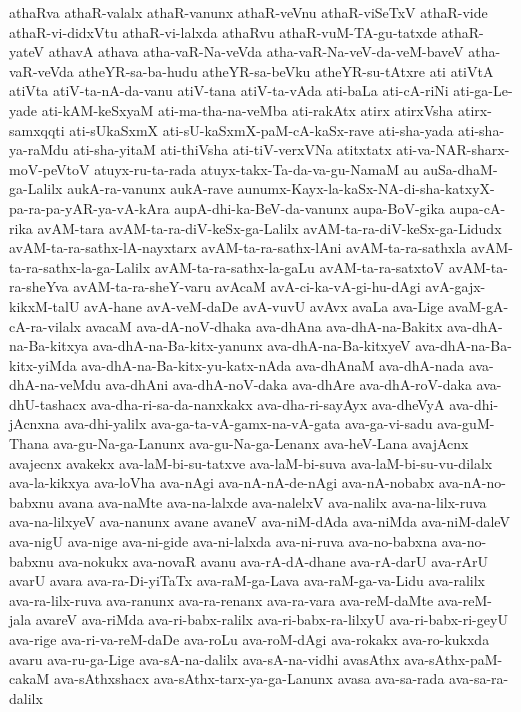 {athaRva
athaR-valalx
athaR-vanunx
athaR-veVnu
athaR-viSeTxV
athaR-vide
athaR-vi-didxVtu
athaR-vi-lalxda
athaRvu
athaR-vuM-TA-gu-tatxde
athaR-yateV
athavA
athava
atha-vaR-Na-veVda
atha-vaR-Na-veV-da-veM-baveV
atha-vaR-veVda
atheYR-sa-ba-hudu
atheYR-sa-beVku
atheYR-su-tAtxre
ati
atiVtA
atiVta
atiV-ta-nA-da-vanu
atiV-tana
atiV-ta-vAda
ati-baLa
ati-cA-riNi
ati-ga-Le-yade
ati-kAM-keSxyaM
ati-ma-tha-na-veMba
ati-rakAtx
atirx
atirxVsha
atirx-samxqqti
ati-sUkaSxmX
ati-sU-kaSxmX-paM-cA-kaSx-rave
ati-sha-yada
ati-sha-ya-raMdu
ati-sha-yitaM
ati-thiVsha
ati-tiV-verxVNa
atitxtatx
ati-va-NAR-sharx-moV-peVtoV
atuyx-ru-ta-rada
atuyx-takx-Ta-da-va-gu-NamaM
au
auSa-dhaM-ga-Lalilx
aukA-ra-vanunx
aukA-rave
aunumx-Kayx-la-kaSx-NA-di-sha-katxyX-pa-ra-pa-yAR-ya-vA-kAra
aupA-dhi-ka-BeV-da-vanunx
aupa-BoV-gika
aupa-cA-rika
avAM-tara
avAM-ta-ra-diV-keSx-ga-Lalilx
avAM-ta-ra-diV-keSx-ga-Lidudx
avAM-ta-ra-sathx-lA-nayxtarx
avAM-ta-ra-sathx-lAni
avAM-ta-ra-sathxla
avAM-ta-ra-sathx-la-ga-Lalilx
avAM-ta-ra-sathx-la-gaLu
avAM-ta-ra-satxtoV
avAM-ta-ra-sheYva
avAM-ta-ra-sheY-varu
avAcaM
avA-ci-ka-vA-gi-hu-dAgi
avA-gajx-kikxM-talU
avA-hane
avA-veM-daDe
avA-vuvU
avAvx
avaLa
ava-Lige
avaM-gA-cA-ra-vilalx
avacaM
ava-dA-noV-dhaka
ava-dhAna
ava-dhA-na-Bakitx
ava-dhA-na-Ba-kitxya
ava-dhA-na-Ba-kitx-yanunx
ava-dhA-na-Ba-kitxyeV
ava-dhA-na-Ba-kitx-yiMda
ava-dhA-na-Ba-kitx-yu-katx-nAda
ava-dhAnaM
ava-dhA-nada
ava-dhA-na-veMdu
ava-dhAni
ava-dhA-noV-daka
ava-dhAre
ava-dhA-roV-daka
ava-dhU-tashacx
ava-dha-ri-sa-da-nanxkakx
ava-dha-ri-sayAyx
ava-dheVyA
ava-dhi-jAcnxna
ava-dhi-yalilx
ava-ga-ta-vA-gamx-na-vA-gata
ava-ga-vi-sadu
ava-guM-Thana
ava-gu-Na-ga-Lanunx
ava-gu-Na-ga-Lenanx
ava-heV-Lana
avajAcnx
avajecnx
avakekx
ava-laM-bi-su-tatxve
ava-laM-bi-suva
ava-laM-bi-su-vu-dilalx
ava-la-kikxya
ava-loVha
ava-nAgi
ava-nA-nA-de-nAgi
ava-nA-nobabx
ava-nA-no-babxnu
avana
ava-naMte
ava-na-lalxde
ava-nalelxV
ava-nalilx
ava-na-lilx-ruva
ava-na-lilxyeV
ava-nanunx
avane
avaneV
ava-niM-dAda
ava-niMda
ava-niM-daleV
ava-nigU
ava-nige
ava-ni-gide
ava-ni-lalxda
ava-ni-ruva
ava-no-babxna
ava-no-babxnu
ava-nokukx
ava-novaR
avanu
ava-rA-dA-dhane
ava-rA-darU
ava-rArU
avarU
avara
ava-ra-Di-yiTaTx
ava-raM-ga-Lava
ava-raM-ga-va-Lidu
ava-ralilx
ava-ra-lilx-ruva
ava-ranunx
ava-ra-renanx
ava-ra-vara
ava-reM-daMte
ava-reM-jala
avareV
ava-riMda
ava-ri-babx-ralilx
ava-ri-babx-ra-lilxyU
ava-ri-babx-ri-geyU
ava-rige
ava-ri-va-reM-daDe
ava-roLu
ava-roM-dAgi
ava-rokakx
ava-ro-kukxda
avaru
ava-ru-ga-Lige
ava-sA-na-dalilx
ava-sA-na-vidhi
avasAthx
ava-sAthx-paM-cakaM
ava-sAthxshacx
ava-sAthx-tarx-ya-ga-Lanunx
avasa
ava-sa-rada
ava-sa-ra-dalilx
}
